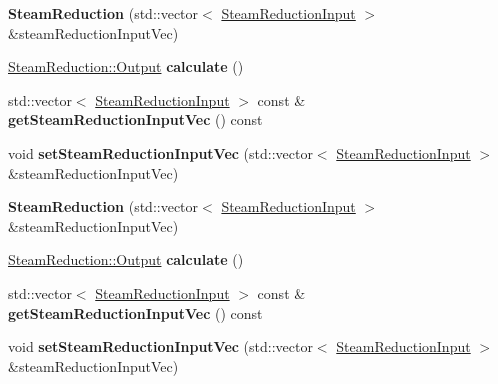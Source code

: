 \begin{DoxyCompactItemize}
\item 
\mbox{\label{class_steam_reduction_a426f4bcc997f18ebee62301abbb1c27e}} 
{\bfseries Steam\+Reduction} (std\+::vector$<$ \hyperlink{class_steam_reduction_input}{Steam\+Reduction\+Input} $>$ \&steam\+Reduction\+Input\+Vec)
\item 
\mbox{\label{class_steam_reduction_a2a6c79eb2648c94afae6c75719cab193}} 
\hyperlink{struct_steam_reduction_1_1_output}{Steam\+Reduction\+::\+Output} {\bfseries calculate} ()
\item 
\mbox{\label{class_steam_reduction_a7862d7d3c48a19cd7ebc68f3e9cbc666}} 
std\+::vector$<$ \hyperlink{class_steam_reduction_input}{Steam\+Reduction\+Input} $>$ const  \& {\bfseries get\+Steam\+Reduction\+Input\+Vec} () const
\item 
\mbox{\label{class_steam_reduction_a872bcd8a94eb663b6e5f1877e7b2f0f2}} 
void {\bfseries set\+Steam\+Reduction\+Input\+Vec} (std\+::vector$<$ \hyperlink{class_steam_reduction_input}{Steam\+Reduction\+Input} $>$ \&steam\+Reduction\+Input\+Vec)
\item 
\mbox{\label{class_steam_reduction_a426f4bcc997f18ebee62301abbb1c27e}} 
{\bfseries Steam\+Reduction} (std\+::vector$<$ \hyperlink{class_steam_reduction_input}{Steam\+Reduction\+Input} $>$ \&steam\+Reduction\+Input\+Vec)
\item 
\mbox{\label{class_steam_reduction_a2a6c79eb2648c94afae6c75719cab193}} 
\hyperlink{struct_steam_reduction_1_1_output}{Steam\+Reduction\+::\+Output} {\bfseries calculate} ()
\item 
\mbox{\label{class_steam_reduction_a7862d7d3c48a19cd7ebc68f3e9cbc666}} 
std\+::vector$<$ \hyperlink{class_steam_reduction_input}{Steam\+Reduction\+Input} $>$ const  \& {\bfseries get\+Steam\+Reduction\+Input\+Vec} () const
\item 
\mbox{\label{class_steam_reduction_a872bcd8a94eb663b6e5f1877e7b2f0f2}} 
void {\bfseries set\+Steam\+Reduction\+Input\+Vec} (std\+::vector$<$ \hyperlink{class_steam_reduction_input}{Steam\+Reduction\+Input} $>$ \&steam\+Reduction\+Input\+Vec)

\end{DoxyCompactItemize}
